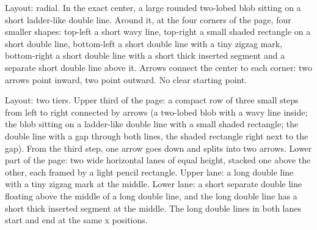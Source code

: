 \begin{Prompt}
[B - Hub] Layout: radial. In the exact center, a large rounded two-lobed blob sitting on a short ladder-like double line. Around it, at the four corners of the page, four smaller shapes: top-left a short wavy line, top-right a small shaded rectangle on a short double line, bottom-left a short double line with a tiny zigzag mark, bottom-right a short double line with a short thick inserted segment and a separate short double line above it. Arrows connect the center to each corner: two arrows point inward, two point outward. No clear starting point.
\end{Prompt}

\begin{Prompt}
 Layout: two tiers. Upper third of the page: a compact row of three small steps from left to right connected by arrows (a two-lobed blob with a wavy line inside; the blob sitting on a ladder-like double line with a small shaded rectangle; the double line with a gap through both lines, the shaded rectangle right next to the gap). From the third step, one arrow goes down and splits into two arrows. Lower part of the page: two wide horizontal lanes of equal height, stacked one above the other, each framed by a light pencil rectangle. Upper lane: a long double line with a tiny zigzag mark at the middle. Lower lane: a short separate double line floating above the middle of a long double line, and the long double line has a short thick inserted segment at the middle. The long double lines in both lanes start and end at the same x positions.
\end{Prompt}

